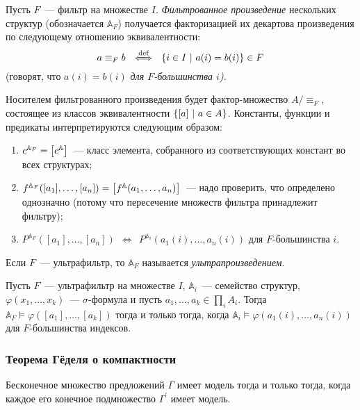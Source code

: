 \begin{definition}
    Пусть $F$~— фильтр на множестве $I$. \emph{Фильтрованное произведение} нескольких структур (обозначается $\mathbb{A}_F$) получается факторизацией их декартова произведения по следующему отношению эквивалентности:
	\[a \equiv_F b\ \ \overset{\text{def}}{\Longleftrightarrow}\ \ 
	  \set*{i \in I\ \middle\vert\ a(i) = b(i)} \in F\]    
    (говорят, что $a(i) = b(i)$ \emph{для $F$-большинства $i$).}

    Носителем фильтрованного произведения будет фактор-множество \(A / {\equiv_F}\), состоящее из классов эквивалентности \(\set*{ \segment*{a}\ \middle\vert\ a \in A}\). Константы, функции и предикаты интерпретируются следующим образом:
    \begin{enumerate}
	\item $c^{\mathbb{A}_F} = \segment*{c^{\mathbb{A}}}$~— класс элемента, собранного из соответствующих констант во всех структурах;
	\item $f^{\mathbb{A}_F}\lr*{[a_1], \ldots, [a_n]} =
	      \segment*{f^{\mathbb{A}}\lr*{a_1, \ldots, a_n}}$~— надо проверить, что определено однозначно (потому что пересечение множеств фильтра принадлежит фильтру); 
	\item $P^{\mathbb{A}_F}([a_1], \ldots, [a_n])\ \ \Longleftrightarrow\ \ 
	       P^{\mathbb{A}_i} (a_1(i), \ldots, a_n(i))$ для $F$-большинства $i$. 
    \end{enumerate}
\end{definition} 

    Если $F$~— ультрафильтр, то $\mathbb{A}_{F}$ называется \textit{ультрапроизведением}.


\begin{theorem}[об ультрапроизведениях]
    Пусть $F$~— ультрафильтр на множестве $I$, $\mathbb{A}_i$~— семейство структур, $\varphi(x_1, \ldots, x_k)$~— $\sigma$-формула и пусть $a_1, \ldots, a_k \in \prod_i A_i$. Тогда $\mathbb{A}_F \models \varphi([a_1], \ldots, [a_k])$ тогда и только тогда, когда $\mathbb{A}_i \models \varphi(a_1(i), \ldots, a_n(i))$ для $F$-большинства индексов.
\end{theorem} 

\subsubsection{Теорема Гёделя о компактности} 

\begin{theorem}
    Бесконечное множество предложений $\Gamma$ имеет модель тогда и только тогда, когда каждое его конечное подмножество $\Gamma^\prime$ имеет модель.
\end{theorem}


